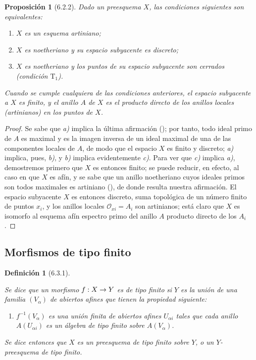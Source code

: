 \documentclass[oneside]{amsart}
\theoremstyle{ega-env-style}
\theoremstyle{ega-thm-env-style}
\newtheorem*{proposition}{Proposición}
\theoremstyle{ega-defn-env-style}
\newtheorem*{definition}{Definición}
\renewcommand{\to}{\mathchoice{\longrightarrow}{\rightarrow}{\rightarrow}{\rightarrow}}
\newcommand{\oldpage}[2][]{{\marginnote{\normalfont{\textbf{#1}~|~#2}}}\ignorespaces}
\let\EGAOriginalLabel\label
\renewcommand{\label}[1]{\phantomsection\EGAOriginalLabel{#1}}
\begin{document}
\oldpage[I]{144}
\begin{proposition}[6.2.2]
\label{I.6.2.2}
Dado
un preesquema $X$, las condiciones siguientes son equivalentes:
\begin{enumerate}
  \item[\textit{a)}] $X$ es un esquema artiniano;
  \item[\textit{b)}] $X$ es noetheriano y su espacio subyacente es discreto;
  \item[\textit{c)}] $X$ es noetheriano y los puntos de su espacio subyacente son cerrados \emph{(condición $\mathrm{T}_1$)}.
\end{enumerate}
Cuando se cumple cualquiera de las condiciones anteriores, el espacio subyacente a $X$ es finito, y el anillo $A$ de $X$ es el producto directo de los anillos locales (artinianos) en los puntos de $X$.
\end{proposition}

\begin{proof}
Se sabe que \emph{a)} implica la última afirmación (\cite[p.~205, th.~3]{I-13}); por tanto, todo ideal primo de $A$ es maximal y es la imagen inversa de un ideal maximal de una de las componentes locales de $A$, de modo que el espacio $X$ es finito y discreto;
\emph{a)} implica, pues, \emph{b)}, y \emph{b)} implica evidentemente \emph{c)}.
Para ver que \emph{c)} implica \emph{a)}, demostremos primero que $X$ es entonces finito;
se puede reducir, en efecto, al caso en que $X$ es afín, y se sabe que un anillo noetheriano cuyos ideales primos son todos maximales es artiniano (\cite[p.~203]{I-13}), de donde resulta nuestra afirmación.
El espacio subyacente $X$ es entonces discreto, suma topológica de un número finito de puntos $x_i$, y los anillos locales $\mathscr{O}_{xi}=A_i$ son artinianos;
está claro que $X$ es isomorfo al esquema afín espectro primo del anillo $A$ producto directo de los $A_i$ .
\end{proof}

\subsection{Morfismos de tipo finito}
\label{subsection:I.6.3}

\begin{definition}[6.3.1]
\label{I.6.3.1}
{\itshape Se dice que un morfismo $f:X\to Y$ es de tipo finito si $Y$ es la unión de una familia $(V_\alpha)$ de abiertos afines que tienen la propiedad siguiente:
\begin{enumerate}
  \item[\textup{(P)}] $f^{-1}(V_\alpha)$ es una unión finita de abiertos afines $U_{\alpha i}$ tales que cada anillo $A(U_{\alpha i})$ es un álgebra de tipo finito sobre $A(V_\alpha)$.
\end{enumerate}
Se dice entonces que $X$ es un preesquema de tipo finito sobre $Y$, o un $Y$-preesquema de tipo finito.}
\end{definition}
\end{document}
